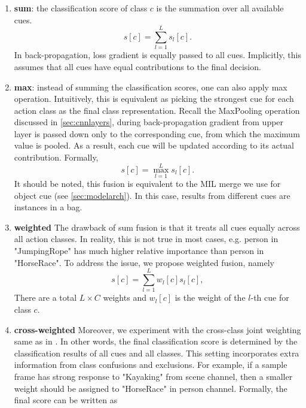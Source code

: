 \begin{enumerate}
\item \textbf{sum}: the classification score of class $ c $ is the summation over all available cues.
\begin{equation}
s\left[c\right] = \sum_{l=1}^{L}s_{l}\left[c\right].
\end{equation}
In back-propagation, loss gradient is equally passed to all cues. Implicitly, this assumes that all cues have equal contributions to the final decision.
\item \textbf{max}: instead of summing the classification scores, one can also apply max operation. 
Intuitively, this is equivalent as picking the strongest cue for each action class as the final class representation.
Recall the MaxPooling operation discussed in \ref{sec:cnnlayers}, during back-propagation gradient from upper layer is passed down only to the corresponding cue, from which the maximum value is pooled.
As a result, each cue will be updated according to its actual contribution.
Formally, 
\begin{equation}
s\left[c\right] = \max_{l=1}^{L}s_{l}\left[c\right].
\end{equation}
It should be noted, this fusion is equivalent to the MIL merge we use for object cue (see \autoref{sec:modelarch}). 
In this case, results from different cues are instances in a bag.
\item \textbf{weighted} The drawback of sum fusion is that it treats all cues equally across all action classes. 
In reality, this is not true in most cases, e.g. person in "JumpingRope" has much higher relative importance than person in "HorseRace".
To address the issue, we propose weighted fusion, namely
\begin{equation}
s\left[c\right] = \sum_{l=1}^{L}w_{l}[c]s_{l}\left[c\right],
\end{equation}
There are a total $ L\times C$ weights and $ w_{l}\left[c\right] $ is the weight of the $ l $-th cue for class $ c $.
\item \textbf{cross-weighted}
Moreover, we experiment with the cross-class joint weighting same as in \cite{xiong2015recognize}.
In other words, the final classification score is determined by the classification results of all cues and all classes.
This setting incorporates extra information from class confusions and exclusions. 
For example, if a sample frame has strong response to "Kayaking" from scene channel, then a smaller weight should be assigned to "HorseRace" in person channel.
Formally, the final score can be written as

\end{enumerate}
